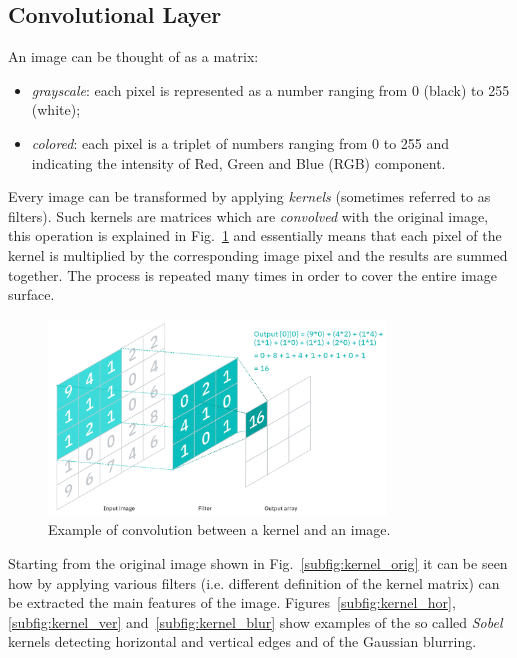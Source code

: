 \subsection{Convolutional Layer}

An image can be thought of as a matrix:
\begin{itemize}
\item \emph{grayscale}: each pixel is represented as a number ranging from 0 (black) to 255 (white);
\item \emph{colored}: each pixel is a triplet of numbers ranging from 0 to 255 and indicating the intensity of Red, Green and Blue (RGB) component.
\end{itemize}

Every image can be transformed by applying \emph{kernels} (sometimes referred to as filters). Such kernels are matrices which are \emph{convolved} with the original image, this operation is explained in Fig.~\ref{fig:convolution} and essentially means that each pixel of the kernel is multiplied by the corresponding image pixel and the results are summed together. The process is repeated many times in order to cover the entire image surface.

\begin{figure}[htb]
\centering
\includegraphics[width=0.8\textwidth]{figures/convolution}
\caption{Example of convolution between a kernel and an image.}
\label{fig:convolution}
\end{figure}

Starting from the original image shown in Fig.~\ref{subfig:kernel_orig} it can be seen how by applying various filters (i.e. different definition of the kernel matrix) can be extracted the main features of the image. Figures~\ref{subfig:kernel_hor}, \ref{subfig:kernel_ver} and~\ref{subfig:kernel_blur} show examples of the so called \emph{Sobel} kernels detecting horizontal and vertical edges and of the Gaussian blurring.

